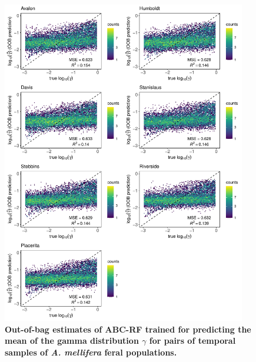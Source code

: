 \documentclass[a4paper, 12pt]{article}
\begin{document}
\begin{figure}[ht]
  \centering
  \includegraphics[width=0.95\textwidth]{Figures/FigureS20_combined_plot_gamma.pdf}
  \small\caption{\textbf{Out-of-bag estimates of ABC-RF trained for predicting the mean of the gamma distribution $\gamma$ for pairs of temporal samples of \textit{A. mellifera} feral populations.}}
  \label{fig:supple_feralbee_gammamean}
\end{figure}
\end{document}
